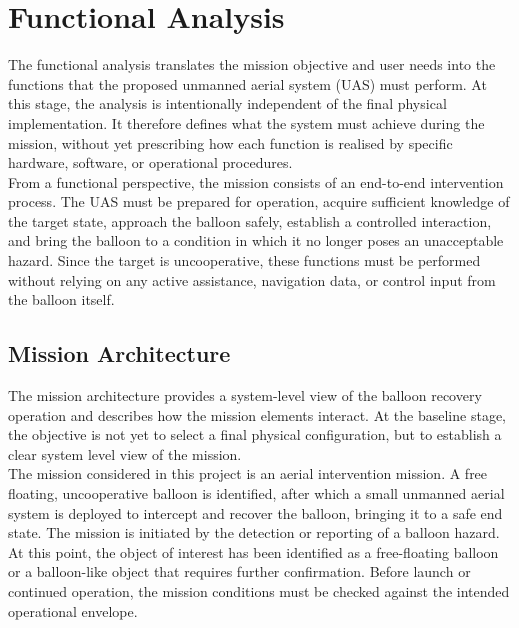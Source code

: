 \vspace{-15pt}
\chapter{Functional Analysis}
\vspace{-10pt}
The functional analysis translates the mission objective and user needs into the functions that the proposed unmanned aerial system (UAS) must perform. At this stage, the analysis is intentionally independent of the final physical implementation. It therefore defines what the system must achieve during the mission, without yet prescribing how each function is realised by specific hardware, software, or operational procedures.\\

From a functional perspective, the mission consists of an end-to-end intervention process. The UAS must be prepared for operation, acquire sufficient knowledge of the target state, approach the balloon safely, establish a controlled interaction, and bring the balloon to a condition in which it no longer poses an unacceptable hazard. Since the target is uncooperative, these functions must be performed without relying on any active assistance, navigation data, or control input from the balloon itself.\\


\vspace{-20pt}
\section{Mission Architecture}

The mission architecture provides a system-level view of the balloon recovery operation and describes how the mission elements interact. At the baseline stage, the objective is not yet to select a final physical configuration, but to establish a clear system level view of the mission.\\

The mission considered in this project is an aerial intervention mission. A free floating, uncooperative balloon is identified, after which a small unmanned aerial system is deployed to intercept and recover the balloon, bringing it to a safe end state. The mission is initiated by the detection or reporting of a balloon hazard. At this point, the object of interest has been identified as a free-floating balloon or a balloon-like object that requires further confirmation. Before launch or continued operation, the mission conditions must be checked against the intended operational envelope.\\

